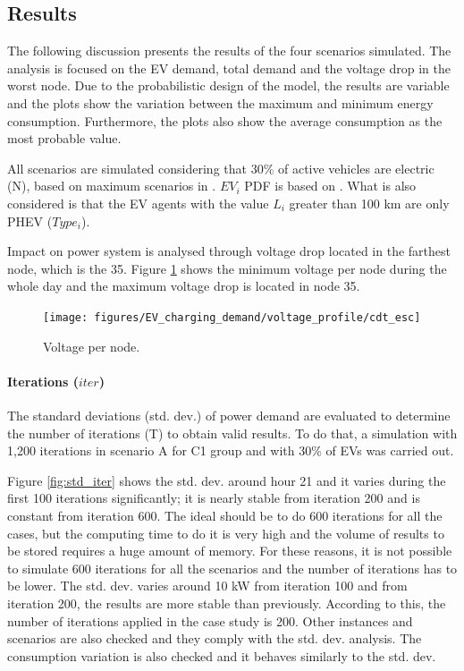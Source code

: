 \documentclass[a4paper,11pt,twoside,openright]{report}
\begin{document}
\subsection{Results}

The following discussion presents the results of the four scenarios simulated. The analysis is focused on the EV demand, total demand and the voltage drop in the worst node. Due to the probabilistic design of the model, the results are variable and the plots show the variation between the maximum and minimum energy consumption. Furthermore, the plots also show the average consumption as the most probable value.

All scenarios are simulated considering that 30$\%$ of active vehicles are electric (N), based on maximum scenarios in \cite{Clement2010,Putrus2009,MaitraCIRED2009}. $EV_{i}$ PDF is based on \cite{EV_Forecast_FandS}. What is also considered is that the EV agents with the value $L_{i}$ greater than 100 km are only PHEV ($Type_{i}$).

Impact on power system is analysed through voltage drop located in the farthest node, which is the 35. Figure \ref{fig:cdt-esc} shows the minimum voltage per node during the whole day and the maximum voltage drop is located in node 35.

\begin{figure}[htbp]
	\centering
	\texttt{[image: figures/EV\_charging\_demand/voltage\_profile/cdt\_esc]}
	\caption{Voltage per node.}
	\label{fig:cdt-esc}
\end{figure}

\paragraph{Iterations ($iter$)} 
The standard deviations (std. dev.) of power demand are evaluated to determine the number of iterations (T) to obtain valid results. To do that, a simulation with 1,200 iterations in scenario A for C1 group and with 30$\%$ of EVs was carried out.

Figure \ref{fig:std_iter} shows the std. dev. around hour 21 and it varies during the first 100 iterations significantly; it is nearly stable from iteration 200 and is constant from iteration 600. The ideal should be to do 600 iterations for all the cases, but the computing time to do it is very high and the volume of results to be stored requires a huge amount of memory. For these reasons, it is not possible to simulate 600 iterations for all the scenarios and the number of iterations has to be lower. The std. dev. varies around 10 kW from iteration 100 and from iteration 200, the results are more stable than previously. According to this, the number of iterations applied in the case study is 200. Other instances and scenarios are also checked and they comply with the std. dev. analysis. The consumption variation is also checked and it behaves similarly to the std. dev.
\end{document}
